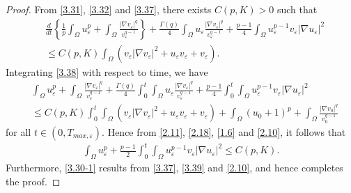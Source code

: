 \documentclass[10pt,a4paper]{amsart}
\begin{document}
\begin{proof}
From \eqref{3.31}, \eqref{3.32} and \eqref{3.37}, there exists $C(p, K)>0$ such that
\begin{align}\label{3.38}
   &\frac{d}{dt}\left\{ \frac{1}{p}\int_{\Omega}u_{\varepsilon}^{p}+\int_{\Omega}\frac{|\nabla
   v_{\varepsilon}|^q}{v_{\varepsilon}^{q-1}}\right\}
   +\frac{\Gamma(q)}{4}\int_{\Omega}u_{\varepsilon}\frac{|\nabla
   v_{\varepsilon}|^q}{v_{\varepsilon}^{q-1}}+\frac{p-1}{4}\int_{\Omega}u_{\varepsilon}^{p-1}v_{\varepsilon}|\nabla
   u_{\varepsilon}|^2\nonumber\\
   &\leq C(p,K)\int_{\Omega}\left( v_{\varepsilon}|\nabla v_{\varepsilon}|^2+u_{\varepsilon}v_{\varepsilon}+v_{\varepsilon} \right).
\end{align}
 Integrating \eqref{3.38} with respect to time, we  have
\begin{align*}
    &\int_{\Omega}u_{\varepsilon}^{p}+\int_{\Omega}\frac{|\nabla
    v_{\varepsilon}|^q}{v_{\varepsilon}^{q-1}}+\frac{\Gamma(q)}{4}\int_0^{t}\int_{\Omega}u_{\varepsilon}\frac{|\nabla
    v_{\varepsilon}|^q}{v_{\varepsilon}^{q-1}}+\frac{p-1}{4}\int_0^{t}\int_{\Omega}u_{\varepsilon}^{p-1}v_{\varepsilon}|\nabla
    u_{\varepsilon}|^2
    \\
    &\leq C(p,K)\int_0^{t}\int_{\Omega}\left(v_{\varepsilon}|\nabla v_{\varepsilon}|^2+u_{\varepsilon}v_{\varepsilon}+v_{\varepsilon}\right)
      +\int_{\Omega}(u_{0}+1)^p+\int_{\Omega}\frac{|\nabla v_{0}|^q}{v_0^{q-1}}
\end{align*}
for all $t\in (0,T_{max,\varepsilon})$. Hence  from \eqref{2.11}, \eqref{2.18}, \eqref{1.6} and \eqref{2.10}, it
follows that
\begin{align}\label{3.39}
    \int_{\Omega}u_{\varepsilon}^{p}+\frac{p-1}{2}\int_0^{t}\int_{\Omega}u_{\varepsilon}^{p-1}v_{\varepsilon}|\nabla u_{\varepsilon}|^2\leq C(p,
    K).
\end{align}
Furthermore, \eqref{3.30-1} results from \eqref{3.37}, \eqref{3.39} and \eqref{2.10}, and hence completes the proof.
\end{proof}
\end{document}
